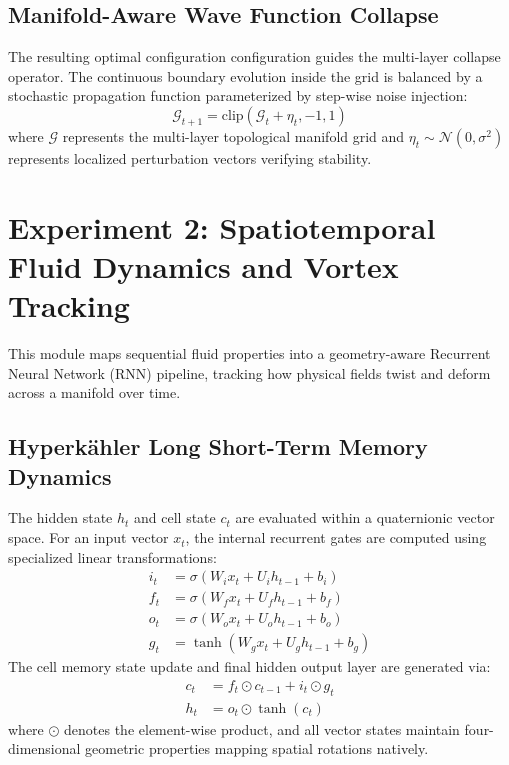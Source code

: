 \documentclass[11pt,a4paper]{article}
\begin{document}
\subsection{Manifold-Aware Wave Function Collapse}
The resulting optimal configuration configuration guides the multi-layer collapse operator. The continuous boundary evolution inside the grid is balanced by a stochastic propagation function parameterized by step-wise noise injection:
\begin{equation}
\mathcal{G}_{t+1} = \text{clip}\left( \mathcal{G}_t + \eta_t, -1, 1 \right)
\end{equation}
where $\mathcal{G}$ represents the multi-layer topological manifold grid and $\eta_t \sim \mathcal{N}(0, \sigma^2)$ represents localized perturbation vectors verifying stability.

\section{Experiment 2: Spatiotemporal Fluid Dynamics and Vortex Tracking}
This module maps sequential fluid properties into a geometry-aware Recurrent Neural Network (RNN) pipeline, tracking how physical fields twist and deform across a manifold over time.

\subsection{Hyperk\"ahler Long Short-Term Memory Dynamics}
The hidden state $h_t$ and cell state $c_t$ are evaluated within a quaternionic vector space. For an input vector $x_t$, the internal recurrent gates are computed using specialized linear transformations:
\begin{align}
i_t &= \sigma(W_i x_t + U_i h_{t-1} + b_i) \\
f_t &= \sigma(W_f x_t + U_f h_{t-1} + b_f) \\
o_t &= \sigma(W_o x_t + U_o h_{t-1} + b_o) \\
g_t &= \tanh(W_g x_t + U_g h_{t-1} + b_g)
\end{align}
The cell memory state update and final hidden output layer are generated via:
\begin{align}
c_t &= f_t \odot c_{t-1} + i_t \odot g_t \\
h_t &= o_t \odot \tanh(c_t)
\end{align}
where $\odot$ denotes the element-wise product, and all vector states maintain four-dimensional geometric properties mapping spatial rotations natively.
\end{document}
